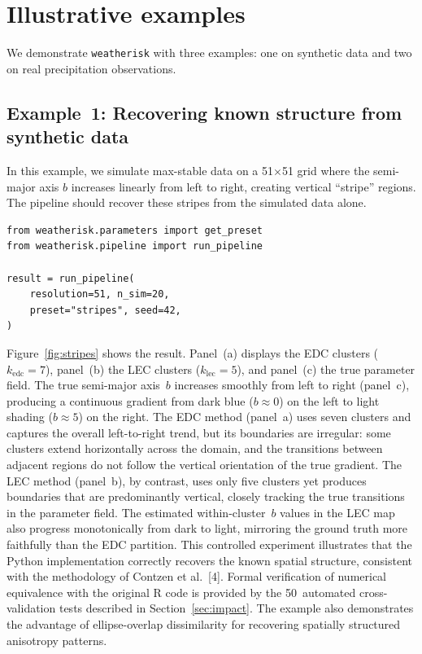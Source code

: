 \documentclass[preprint,12pt,a4paper]{elsarticle}
\begin{document}
\section{Illustrative examples}
\label{sec:examples}

We demonstrate \texttt{weatherisk} with three examples: one on
synthetic data and two on real precipitation observations.

\subsection{Example~1: Recovering known structure from
  synthetic data}
\label{sec:ex-synthetic}

In this example, we simulate max-stable data on a 51$\times$51 grid
where the semi-major axis $b$ increases linearly from left to right,
creating vertical ``stripe'' regions.  The pipeline should recover
these stripes from the simulated data alone.

\begin{lstlisting}[caption={Running the stripes validation.},
  label=lst:validate]
from weatherisk.parameters import get_preset
from weatherisk.pipeline import run_pipeline

result = run_pipeline(
    resolution=51, n_sim=20,
    preset="stripes", seed=42,
)
\end{lstlisting}

Figure~\ref{fig:stripes} shows the result.  Panel~(a) displays the
EDC clusters ($k_{\text{edc}} = 7$), panel~(b) the LEC clusters
($k_{\text{lec}} = 5$), and panel~(c) the true parameter field.
The true semi-major axis~$b$ increases smoothly from left to right
(panel~c), producing a continuous gradient from dark blue ($b
\approx 0$) on the left to light shading ($b \approx 5$) on the
right.  The EDC method (panel~a) uses seven clusters and captures
the overall left-to-right trend, but its boundaries are irregular:
some clusters extend horizontally across the domain, and the
transitions between adjacent regions do not follow the vertical
orientation of the true gradient.  The LEC method (panel~b), by
contrast, uses only five clusters yet produces boundaries that are
predominantly vertical, closely tracking the true transitions in
the parameter field.  The estimated within-cluster~$b$ values in
the LEC map also progress monotonically from dark to light,
mirroring the ground truth more faithfully than the EDC partition.
This controlled experiment illustrates that the Python
implementation correctly recovers the known spatial structure,
consistent with the methodology of Contzen et al.~[4].  Formal
verification of numerical equivalence with the original R code
is provided by the 50~automated cross-validation tests described
in Section~\ref{sec:impact}.  The example also demonstrates the
advantage of ellipse-overlap dissimilarity for recovering
spatially structured anisotropy patterns.
\end{document}
